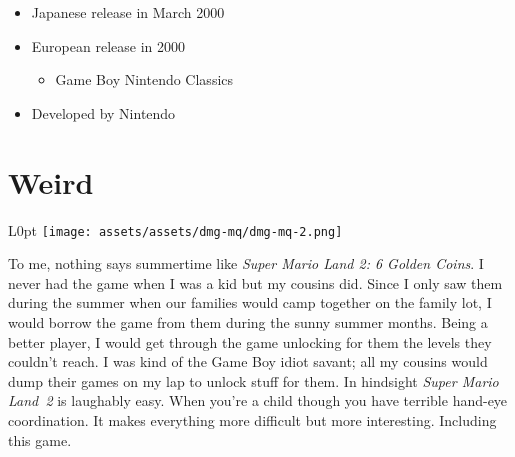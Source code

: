 \documentclass{book}
\begin{document}
\begin{itemize} [nosep]
\item Japanese release in March 2000







\item European release in 2000
\begin{itemize} [nosep]\item Game Boy Nintendo Classics\end{itemize}\noindent




































\item Developed by Nintendo

\end{itemize}\noindent

\newpage\FloatBarrier\needspace{10mm}\section*{Weird}\nopagebreak[4]
\begin{wrapfigure}{L}{0pt} \texttt{[image: assets/assets/dmg-mq/dmg-mq-2.png]}\end{wrapfigure}
To me, nothing says summertime like \emph{Super Mario Land 2: 6 Golden Coins}. I never had the game when I was a kid but my cousins did. Since I only saw them during the summer when our families would camp together on the family lot, I would borrow the game from them during the sunny summer months. Being a better player, I would get through the game unlocking for them the levels they couldn’t reach. I was kind of the Game Boy idiot savant; all my cousins would dump their games on my lap to unlock stuff for them. In hindsight \emph{Super Mario Land 2} is laughably easy. When you’re a child though you have terrible hand-eye coordination. It makes everything more difficult but more interesting. Including this game.
\end{document}
